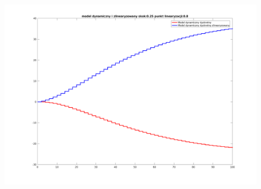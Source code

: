 \documentclass[a4paper, 11pt]{article}
\begin{document}
\begin{figure}[H]
\centering
\includegraphics[scale=0.45]{9258.png}
\end{figure}
\end{document}
